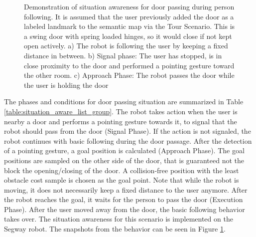 \begin{figure}[ht!]
{        }
    \caption{Demonstration of situation awareness for door passing during person following. It is assumed that the user previously added the door as a labeled landmark to the semantic map via the Tour Scenario. This is a swing door with spring loaded hinges, so it would close if not kept open actively. a) The robot is following the user by keeping a fixed distance in between. b) Signal phase: The user has stopped, is in close proximity to the door and performed a pointing gesture toward the other room. c) Approach Phase: The robot passes the door while the user is holding the door}
   \label{fig:situtation_aware_door_passing}
\end{figure}



The phases and conditions for door passing situation are summarized in Table \ref{table:situation_aware_list_group}. The robot takes action when the user is nearby a door and performs a pointing gesture towards it, to signal that the robot should pass from the door (Signal Phase). If the action is not signaled, the robot continues with basic following during the door passage. After the detection of a pointing gesture, a goal position is calculated (Approach Phase). The goal positions are sampled on the other side of the door, that is guaranteed not the block the opening/closing of the door. A collision-free position with the least obstacle cost sample is chosen as the goal point. Note that while the robot is moving, it does not necessarily keep a fixed distance to the user anymore. After the robot reaches the goal, it waits for the person to pass the door (Execution Phase). After the user moved away from the door, the basic following behavior takes over. The situation awareness for this scenario is implemented on the Segway robot. The snapshots from the behavior can be seen in Figure \ref{fig:situtation_aware_door_passing}.